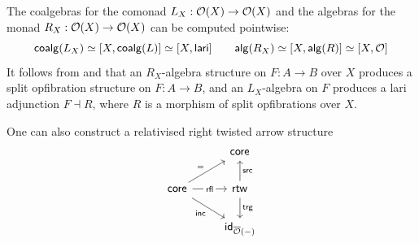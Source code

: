 \begin{theorem}\label{thm:relativised-algebras}
  The coalgebras for the comonad $L_X : {\mathcal{O}}(X) \to {\mathcal{O}}(X)$
  and the algebras for the monad $R_X : {\mathcal{O}}(X) \to {\mathcal{O}}(X)$
  can be computed pointwise:
  \[
    \mathsf{coalg}(L_X) \simeq [X,\mathsf{coalg}(L)] \simeq [X,\mathsf{lari}]
    \quad \quad
    \mathsf{alg}(R_X) \simeq [X,\mathsf{alg}(R)] \simeq [X,{\mathcal{O}}]
  \]
  It follows from 
  and 
  that an $R_X$-algebra structure on $F : A \to B$ over $X$
  produces a split opfibration structure on $F : A \to B$,
  and an $L_X$-algebra on $F$ produces a lari adjunction $F \dashv R$,
  where $R$ is a morphism of split opfibrations over $X$.
\end{theorem}

One can also construct a relativised right twisted arrow structure
\[\begin{tikzcd}
	& {\vCore{}} \\
	{\vCore{}} & {\rtw{}} \\
	& {\id_{\opfib(-)}}
	\arrow["{=}", from=2-1, to=1-2]
	\arrow["\rfl"{description}, from=2-1, to=2-2]
	\arrow["\inc"', from=2-1, to=3-2]
	\arrow["\src"', from=2-2, to=1-2]
	\arrow["\trg", from=2-2, to=3-2]
\end{tikzcd}\]


